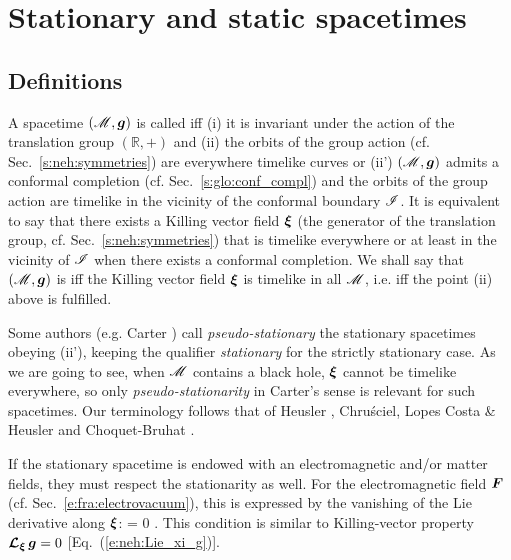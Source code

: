 \section{Stationary and static spacetimes} \label{s:sta:sta_st}

\subsection{Definitions} \label{s:sta:def_station}

\begin{greybox}
A spacetime $(\mathscr{M},\bm{g})$ is called 
iff (i) it is invariant under
the action of the translation group $(\mathbb{R},+)$ and (ii) the orbits of
the group action (cf. Sec.~\ref{s:neh:symmetries})
are everywhere timelike curves or (ii') $(\mathscr{M},\bm{g})$
admits a conformal completion (cf. Sec.~\ref{s:glo:conf_compl})
and the orbits of the group action are timelike in the vicinity of
the conformal boundary $\mathscr{I}$.
It is equivalent to say that there exists a Killing vector field
$\bm{\xi}$ (the generator of the translation group, cf. Sec.~\ref{s:neh:symmetries}) that is
timelike everywhere or at least in the vicinity of $\mathscr{I}$ when there exists a conformal
completion. We shall say that $(\mathscr{M},\bm{g})$ is  iff the Killing vector field $\bm{\xi}$ is timelike in all $\mathscr{M}$,
i.e. iff the point (ii) above is fulfilled.
\end{greybox}

\begin{remark} \label{r:sta:pseudo-stationary}
Some authors (e.g. Carter \cite{Carte73b}) call
\emph{pseudo-stationary} the stationary spacetimes
obeying (ii'), keeping the qualifier
\emph{stationary} for the strictly stationary case.
As we are going to see, when $\mathscr{M}$
contains a black hole, $\bm{\xi}$ cannot be timelike everywhere,
so only \emph{pseudo-stationarity} in Carter's sense is relevant for such spacetimes.
Our terminology follows that of
Heusler \cite{Heusl96},
Chru\'sciel, Lopes Costa \& Heusler \cite{ChrusLH12}
and Choquet-Bruhat \cite{Choqu09}.
\end{remark}

If the stationary spacetime is endowed with an electromagnetic and/or
matter fields, they must respect the stationarity as well. For the electromagnetic
field $\bm{F}$ (cf. Sec.~\ref{e:fra:electrovacuum}), this is expressed by
the vanishing of the Lie derivative along $\bm{\xi}$:
\be
    \Lie{\xi}  = 0 .
\ee
This condition is similar to Killing-vector property
$\bm{\mathcal{L}}_{\bm{\xi}}\, \bm{g} = 0$ [Eq.~(\ref{e:neh:Lie_xi_g})].


